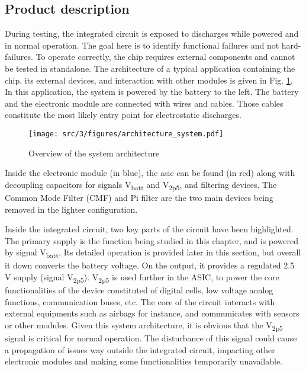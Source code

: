\subsection{Product description}
\label{sec:product-desc}

During testing, the integrated circuit is exposed to discharges while powered and in normal operation.
The goal here is to identify functional failures and not hard-failures.
To operate correctly, the chip requires external components and cannot be tested in standalone.
The architecture of a typical application containing the chip, its external devices, and interaction with other modules is given in Fig. \ref{fig:system_architecture}.
In this application, the system is powered by the battery to the left.
The battery and the electronic module are connected with wires and cables.
Those cables constitute the most likely entry point for electrostatic discharges.

\begin{figure}[!h]
  \centering
  \texttt{[image: src/3/figures/architecture\_system.pdf]}
  \caption{Overview of the system architecture}
  \label{fig:system_architecture}
\end{figure}

Inside the electronic module (in blue), the \gls{asic} can be found (in red) along with decoupling capacitors for signals V\textsubscript{batt} and V\textsubscript{2p5}, and filtering devices.
The Common Mode Filter (CMF) and Pi filter are the two main devices being removed in the lighter configuration.

Inside the integrated circuit, two key parts of the circuit have been highlighted.
The primary supply is the function being studied in this chapter, and is powered by signal V\textsubscript{batt}.
Its detailed operation is provided later in this section, but overall it down converts the battery voltage.
On the output, it provides a regulated 2.5 V supply (signal V\textsubscript{2p5}).
V\textsubscript{2p5} is used further in the ASIC, to power the core functionalities of the device constituted of digital cells, low voltage analog functions, communication buses, etc.
The core of the circuit interacts with external equipments such as airbags for instance, and communicates with sensors or other modules.
Given this system architecture, it is obvious that the V\textsubscript{2p5} signal is critical for normal operation.
The disturbance of this signal could cause a propagation of issues way outside the integrated circuit, impacting other electronic modules and making some functionalities temporarily unavailable.

